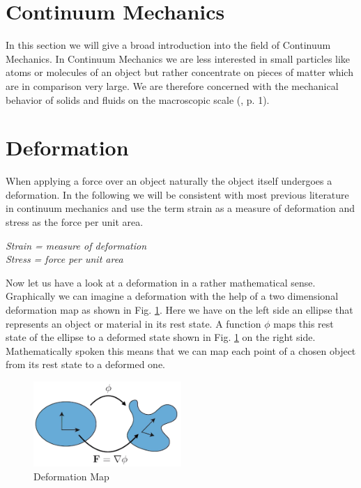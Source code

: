 \section{Continuum Mechanics}
In this section we will give a broad introduction into the field of Continuum Mechanics. In Continuum Mechanics we are less interested in small particles like atoms or molecules of an object but rather concentrate on pieces of matter which are in comparison very large. We are therefore concerned with the mechanical behavior of solids and fluids on the macroscopic scale (\cite{Spencer1980}, p. 1).


\section{Deformation}
When applying a force over an object naturally the object itself undergoes a deformation. In the following we will be consistent with most previous literature in continuum mechanics and use the term strain as a measure of deformation and stress as the force per unit area.

\begin{addmargin}[2cm]{2cm}
\textit{Strain = measure of deformation}  \\
\textit{Stress = force per unit area} 
\end{addmargin}




Now let us have a look at a deformation in a rather mathematical sense. Graphically we can imagine a deformation with the help of a two dimensional deformation map as shown in Fig. \ref{fig:deformationmap}. Here we have on the left side an ellipse that represents an object or material in its rest state. A function $\phi$ maps this rest state of the ellipse to a deformed state shown in Fig. \ref{fig:deformationmap} on the right side. Mathematically spoken this means that we can map each point of a chosen object from its rest state to a deformed one.

\begin{figure}[!htbp]
	\centering
	\includegraphics[width=0.5\textwidth]{resources/deformation_map}
	\caption{Deformation Map {\cite{STREAM2018}}}
	\label{fig:deformationmap}
\end{figure}

